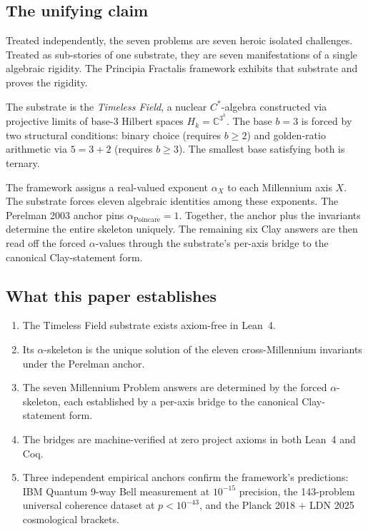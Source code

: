 \documentclass[11pt,a4paper]{article}
\theoremstyle{plain}
\theoremstyle{definition}
\begin{document}
\subsection{The unifying claim}

Treated independently, the seven problems are seven heroic isolated
challenges. Treated as sub-stories of one substrate, they are seven
manifestations of a single algebraic rigidity. The Principia
Fractalis framework exhibits that substrate and proves the rigidity.

The substrate is the \emph{Timeless Field}, a nuclear $C^{*}$-algebra
constructed via projective limits of base-3 Hilbert spaces
$H_{k} = \mathbb{C}^{3^{k}}$. The base $b = 3$ is forced by two
structural conditions: binary choice (requires $b \ge 2$) and
golden-ratio arithmetic via $5 = 3 + 2$ (requires $b \ge 3$). The
smallest base satisfying both is ternary.

The framework assigns a real-valued exponent $\alpha_{X}$ to each
Millennium axis $X$. The substrate forces eleven algebraic
identities among these exponents. The Perelman 2003 anchor pins
$\alpha_{\mathrm{Poincar\acute e}} = 1$. Together, the anchor plus
the invariants determine the entire skeleton uniquely. The
remaining six Clay answers are then read off the forced
$\alpha$-values through the substrate's per-axis bridge to the
canonical Clay-statement form.

\subsection{What this paper establishes}

\begin{enumerate}[label=(\textbf{\arabic*}),leftmargin=*]
\item The Timeless Field substrate exists axiom-free in Lean~4.
\item Its $\alpha$-skeleton is the unique solution of the eleven
cross-Millennium invariants under the Perelman anchor.
\item The seven Millennium Problem answers are determined by the
forced $\alpha$-skeleton, each established by a per-axis bridge
to the canonical Clay-statement form.
\item The bridges are machine-verified at zero project axioms in
both Lean~4 and Coq.
\item Three independent empirical anchors confirm the framework's
predictions: IBM Quantum 9-way Bell measurement at $10^{-15}$
precision, the 143-problem universal coherence dataset at
$p < 10^{-43}$, and the Planck 2018 + LDN 2025 cosmological
brackets.
\end{enumerate}
\end{document}
